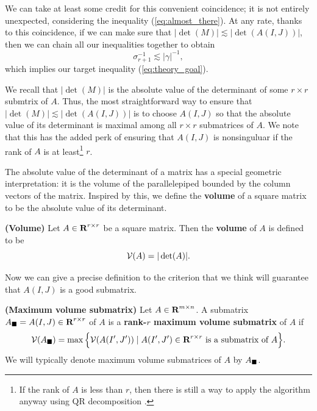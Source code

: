 \documentclass{article}
\begin{document}
	We can take at least some credit for this convenient coincidence; it is not entirely unexpected, considering the inequality (\ref{eq:almost_there}). At any rate, thanks to this coincidence, if we can make sure that $|\det(M)| \lesssim |\det(A(I,J))|$, then we can chain all our inequalities together to obtain
	\begin{equation}
		\sigma_{r+1}^{-1} \lesssim |\gamma|^{-1},
	\end{equation}
	which implies our target inequality (\ref{eq:theory_goal}).
	
	We recall that $|\det(M)|$ is the absolute value of the determinant of some $r\times r$ submtrix of $A$. Thus, the most straightforward way to ensure that $|\det(M)|\lesssim |\det(A(I,J))|$ is to choose $A(I,J)$ so that the absolute value of its determinant is maximal among all $r\times r$ submatrices of $A$.  We note that this has the added perk of ensuring that $A(I,J)$ is nonsinguluar if the rank of $A$ is at least\footnote{If the rank of $A$ is less than $r$, then there is still a way to apply the algorithm anyway using QR decomposition \cite{goreinov_2010}.} $r$.
	
	The absolute value of the determinant of a matrix has a special geometric interpretation: it is the volume of the parallelepiped bounded by the column vectors of the matrix. Inspired by this, we define the \textbf{volume} of a square matrix to be the absolute value of its determinant.
	
	\begin{dfn} \textnormal{\bf(Volume)}
		\label{def:volume}
		Let $A \in \textnormal{\bf R}^{r\times r}$ be a square matrix. Then the \textbf{volume} of $A$ is defined to be
		\begin{equation}
			\mathcal{V}(A) = |\det(A)|.
		\end{equation}
	\end{dfn}
	
	Now we can give a precise definition to the criterion that we think will guarantee that $A(I,J)$ is a good submatrix.
	
	\begin{dfn} \textnormal{\bf(Maximum volume submatrix)}
		\label{def:max_volume_submatrix}
		Let $A \in \textnormal{\bf R}^{m\times n}$. A submatrix $A_\blacksquare = A(I,J) \in \textnormal{\bf R}^{r\times r}$ of $A$ is a \textbf{rank-$r$ maximum volume submatrix} of $A$ if
		\begin{equation}
			\mathcal{V}(A_\blacksquare) = \max\Big\{\mathcal{V}(A(I', J')) \mid A(I',J') \in \textnormal{\bf R}^{r\times r} \textnormal{ is a submatrix of } A\Big\}.
		\end{equation}
		We will typically denote maximum volume submatrices of $A$ by $A_\blacksquare$.
	\end{dfn}
	
\end{document}
